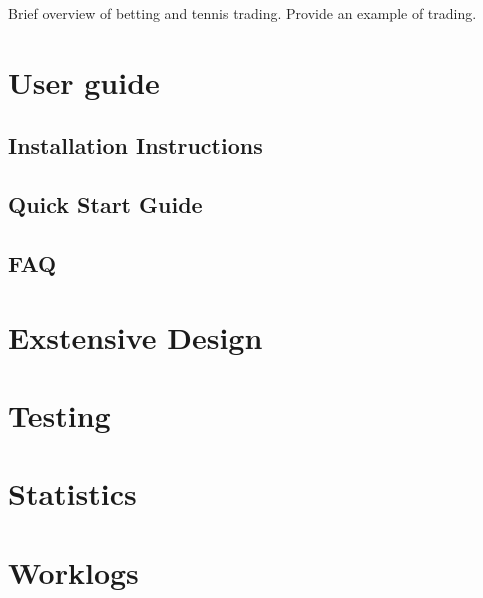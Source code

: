 \documentclass[10pt]{report}
\begin{document}
Brief overview of betting and tennis trading.
Provide an example of trading.

\chapter{User guide}

\section{Installation Instructions}

\section{Quick Start Guide}

\section{FAQ}

\chapter{Exstensive Design}

\chapter{Testing}

\chapter{Statistics}

\chapter{Worklogs}
\end{document}
